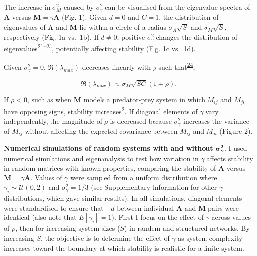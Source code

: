 \documentclass[]{article}
\begin{document}
The increase in \(\sigma^{2}_{M}\) caused by \(\sigma^{2}_\gamma\) can
be visualised from the eigenvalue spectra of \(\textbf{A}\) versus
\(\textbf{M} = \gamma\textbf{A}\) (Fig. 1). Given \(d = 0\) and
\(C = 1\), the distribution of eigenvalues of \(\textbf{A}\) and
\(\textbf{M}\) lie within a circle of a radius \(\sigma_{A}\sqrt{S}\)
and \(\sigma_{M}\sqrt{S}\), respectively (Fig. 1a vs.~1b). If
\(d \neq 0\), positive \(\sigma^{2}_\gamma\) changes the distribution of
eigenvalues\textsuperscript{\protect\hyperlink{ref-Ahmadian2015}{21}--\protect\hyperlink{ref-Stone2017}{23}},
potentially affecting stability (Fig. 1c vs.~1d).

Given \(\sigma^{2}_\gamma = 0\), \(\Re(\lambda_{max})\) decreases
linearly with \(\rho\) such
that\textsuperscript{\protect\hyperlink{ref-Tang2014c}{24}},

\begin{equation} \label{rho_stab}
\Re(\lambda_{max}) \approx \sigma_{M}\sqrt{SC}\left(1 + \rho\right).
\end{equation}

If \(\rho < 0\), such as when \(\textbf{M}\) models a predator-prey
system in which \(M_{ij}\) and \(M_{ji}\) have opposing signs, stability
increases\textsuperscript{\protect\hyperlink{ref-Allesina2012}{2}}. If
diagonal elements of \(\gamma\) vary independently, the magnitude of
\(\rho\) is decreased because \(\sigma^{2}_{\gamma}\) increases the
variance of \(M_{ij}\) without affecting the expected covariance between
\(M_{ij}\) and \(M_{ji}\) (Figure 2).

\textbf{Numerical simulations of random systems with and without
\(\mathbf{\sigma^{2}_{\gamma}}\)}. I used numerical simulations and
eigenanalysis to test how variation in \(\gamma\) affects stability in
random matrices with known properties, comparing the stability of
\(\textbf{A}\) versus \(\mathbf{M} = \gamma\mathbf{A}\). Values of
\(\gamma\) were sampled from a uniform distribution where
\(\gamma_{i} \sim \mathcal{U}(0, 2)\) and \(\sigma^{2}_{\gamma} = 1/3\)
(see Supplementary Information for other \(\gamma\) distributions, which
gave similar results). In all simulations, diagonal elements were
standardised to ensure that \(-d\) between individual \(\textbf{A}\) and
\(\textbf{M}\) pairs were identical (also note that
\(E[\gamma_{i}] = 1\)). First I focus on the effect of \(\gamma\) across
values of \(\rho\), then for increasing system sizes (\(S\)) in random
and structured networks. By increasing \(S\), the objective is to
determine the effect of \(\gamma\) as system complexity increases toward
the boundary at which stability is realistic for a finite system.
\end{document}
